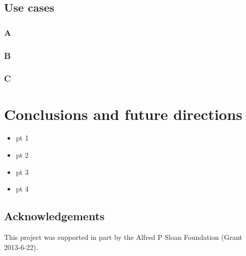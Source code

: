 \documentclass[author-year, review, 11pt]{components/elsarticle} %
\newenvironment{Shaded}{\begin{snugshade}}{\end{snugshade}}
\newcommand{\KeywordTok}[1]{\textcolor[rgb]{0.13,0.29,0.53}{\textbf{{#1}}}}
\newcommand{\DataTypeTok}[1]{\textcolor[rgb]{0.13,0.29,0.53}{{#1}}}
\newcommand{\DecValTok}[1]{\textcolor[rgb]{0.00,0.00,0.81}{{#1}}}
\newcommand{\StringTok}[1]{\textcolor[rgb]{0.31,0.60,0.02}{{#1}}}
\newcommand{\CommentTok}[1]{\textcolor[rgb]{0.56,0.35,0.01}{\textit{{#1}}}}
\newcommand{\NormalTok}[1]{{#1}}
\begin{document}
\begin{Shaded}
\end{Shaded}

\subsection{Use cases}\label{use-cases}

\subsubsection{A}\label{a}

\subsubsection{B}\label{b}

\subsubsection{C}\label{c}

\section{Conclusions and future
directions}\label{conclusions-and-future-directions}

\begin{itemize}
\itemsep1pt\parskip0pt
\item
  pt 1
\item
  pt 2
\item
  pt 3
\item
  pt 4
\end{itemize}

\subsection{Acknowledgements}\label{acknowledgements}

This project was supported in part by the Alfred P Sloan Foundation
(Grant 2013-6-22).
\end{document}

